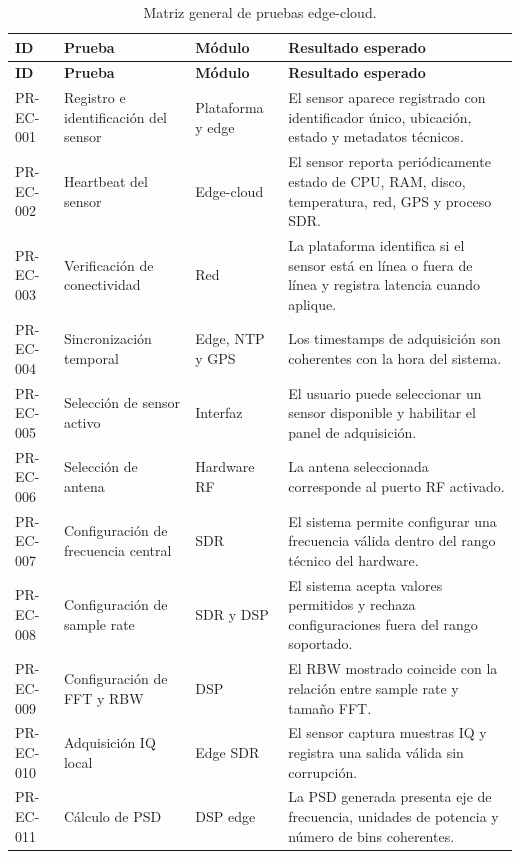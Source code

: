 \begingroup
\small
\setlength{\tabcolsep}{3pt}
\begin{longtable}{|>{\raggedright\arraybackslash}p{1.6cm}|>{\raggedright\arraybackslash}p{3.2cm}|>{\raggedright\arraybackslash}p{3.2cm}|>{\raggedright\arraybackslash}p{5.0cm}|}
\caption{Matriz general de pruebas edge-cloud.}
\label{tab:matriz-pruebas-edge-cloud}\\
\hline
\textbf{ID} & \textbf{Prueba} & \textbf{Módulo} & \textbf{Resultado esperado} \\
\hline
\endfirsthead
\hline
\textbf{ID} & \textbf{Prueba} & \textbf{Módulo} & \textbf{Resultado esperado} \\
\hline
\endhead
PR-EC-001 & Registro e identificación del sensor & Plataforma y edge & El sensor aparece registrado con identificador único, ubicación, estado y metadatos técnicos. \\
\hline
PR-EC-002 & Heartbeat del sensor & Edge-cloud & El sensor reporta periódicamente estado de CPU, RAM, disco, temperatura, red, GPS y proceso SDR. \\
\hline
PR-EC-003 & Verificación de conectividad & Red & La plataforma identifica si el sensor está en línea o fuera de línea y registra latencia cuando aplique. \\
\hline
PR-EC-004 & Sincronización temporal & Edge, NTP y GPS & Los timestamps de adquisición son coherentes con la hora del sistema. \\
\hline
PR-EC-005 & Selección de sensor activo & Interfaz & El usuario puede seleccionar un sensor disponible y habilitar el panel de adquisición. \\
\hline
PR-EC-006 & Selección de antena & Hardware RF & La antena seleccionada corresponde al puerto RF activado. \\
\hline
PR-EC-007 & Configuración de frecuencia central & SDR & El sistema permite configurar una frecuencia válida dentro del rango técnico del hardware. \\
\hline
PR-EC-008 & Configuración de sample rate & SDR y DSP & El sistema acepta valores permitidos y rechaza configuraciones fuera del rango soportado. \\
\hline
PR-EC-009 & Configuración de FFT y RBW & DSP & El RBW mostrado coincide con la relación entre sample rate y tamaño FFT. \\
\hline
PR-EC-010 & Adquisición IQ local & Edge SDR & El sensor captura muestras IQ y registra una salida válida sin corrupción. \\
\hline
PR-EC-011 & Cálculo de PSD & DSP edge & La PSD generada presenta eje de frecuencia, unidades de potencia y número de bins coherentes. \\

\end{longtable}
